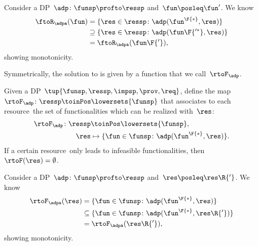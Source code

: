 \begin{remark}[Monotonicity]
    Consider a DP~$\adp\colon\funsp\profto\ressp$ and~$\fun\posleq \fun'$.
    We know
    \begin{equation*}
        \begin{aligned}
            \ftoR_\adpa(\fun) & =\{ \res \in \ressp \colon \adp(\fun^\F{*}, \res)\}           \\
                              & \supseteq \{ \res \in \ressp \colon \adp(\fun\F{'^*}, \res)\} \\
                              & =\ftoR_\adpa(\fun\F{'}),
        \end{aligned}
    \end{equation*}
    showing monotonicity.
\end{remark}

Symmetrically, the solution to \FixResMaxFun is given by a function that we call~$\rtoF_\adp$.

\begin{definition}
    \label{def:rtoF-dp}
    Given a DP~$\tup{ \funsp,\ressp,\impsp,\prov,\req}$, define the map~$\rtoF_{\adp}\colon \ressp\toinPos  \lowersets{\funsp}$ that associates to each resource~\res the set of functionalities which can be realized with~$\res$:
    \begin{equation*}
        \begin{aligned}
            \rtoF_{\adp}\colon \ressp & \toinPos \lowersets{\funsp},                                \\
            \res                      & \mapsto \{ \fun \in \funsp \colon \adp(\fun^\F{*}, \res)\}.
        \end{aligned}
    \end{equation*}
    If a certain resource~\res only leads to infeasible functionalities, then~$\rtoF(\res)=\emptyset$.
\end{definition}

\begin{remark}[Monotonicity]
    Consider a DP~$\adp\colon\funsp\profto\ressp$ and~$\res\posleq \res\R{'}$.
    We know
    \begin{equation*}
        \begin{aligned}
            \rtoF_\adpa(\res) & =\{ \fun \in \funsp \colon \adp(\fun^\F{*}, \res)\}               \\
                              & \subseteq \{ \fun \in \funsp \colon \adp(\fun^\F{*}, \res\R{'})\} \\
                              & =\rtoF_\adpa(\res\R{'}),
        \end{aligned}
    \end{equation*}
    showing monotonicity.
\end{remark}

